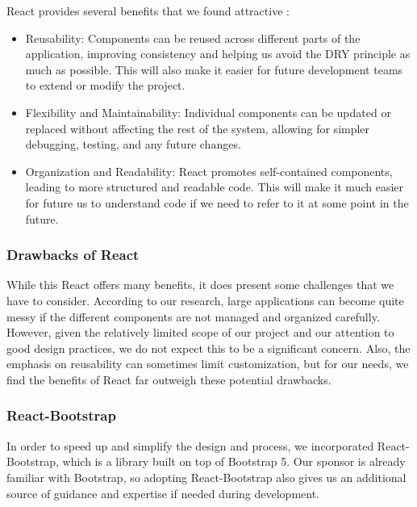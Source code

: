 \documentclass[12pt,titlepage]{article}
\begin{document}
React provides several benefits that we found attractive \cite{react-legacy-getting-started,}:
\begin{itemize}
	\item Reusability: Components can be reused across different parts of the application, improving consistency and helping us avoid the DRY principle as much as possible. This will also make it easier for future development teams to extend or modify the project.
	\item Flexibility and Maintainability: Individual components can be updated or replaced without affecting the rest of the system, allowing for simpler debugging, testing, and any future changes. 
	\item Organization and Readability: React promotes self-contained components, leading to more structured and readable code. This will make it much easier for future us to understand code if we need to refer to it at some point in the future.
\end{itemize}

\subsubsection{Drawbacks of React}
While this React offers many benefits, it does present some challenges that we have to consider. According to our research, large applications can become quite messy if the different components are not managed and organized carefully. However, given the relatively limited scope of our project and our attention to good design practices, we do not expect this to be a significant concern. Also, the emphasis on reusability can sometimes limit customization, but for our needs, we find the benefits of React far outweigh these potential drawbacks.

\subsubsection{React-Bootstrap}
In order to speed up and simplify the design and process, we incorporated React-Bootstrap, which is a library built on top of Bootstrap 5. Our sponsor is already familiar with Bootstrap, so adopting React-Bootstrap also gives us an additional source of guidance and expertise if needed during development.
\end{document}
